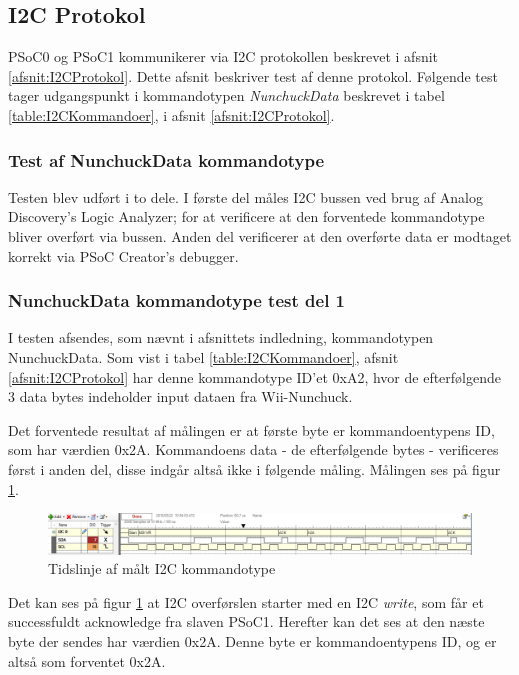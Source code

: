 \subsection{I2C Protokol}
PSoC0 og PSoC1 kommunikerer via I2C protokollen beskrevet i afsnit \ref{afsnit:I2CProtokol}. Dette afsnit beskriver test af denne protokol. Følgende test tager udgangspunkt i kommandotypen \textit{NunchuckData} beskrevet i tabel \ref{table:I2CKommandoer}, i afsnit \ref{afsnit:I2CProtokol}.

\subsubsection{Test af NunchuckData kommandotype} 

Testen blev udført i to dele. I første del måles I2C bussen ved brug af Analog Discovery's Logic Analyzer; for at verificere at den forventede kommandotype bliver overført via bussen. Anden del verificerer at den overførte data er modtaget korrekt via PSoC Creator's debugger.

\subsubsection{NunchuckData kommandotype test del 1}

I testen afsendes, som nævnt i afsnittets indledning, kommandotypen NunchuckData. Som vist i tabel \ref{table:I2CKommandoer}, afsnit \ref{afsnit:I2CProtokol} har denne kommandotype ID'et 0xA2, hvor de efterfølgende 3 data bytes indeholder input dataen fra Wii-Nunchuck. \newline

\noindent Det forventede resultat af målingen er at første byte er kommandoentypens ID, som har værdien 0x2A. Kommandoens data - de efterfølgende bytes - verificeres først i anden del, disse indgår altså ikke i følgende måling. Målingen ses på figur \ref{fig:NunchuckDataCommand}.

\begin{figure}[H]
	\centering
	\includegraphics[width=1.2\textwidth]{Test/images/ShowsNunchuckDataCommand.png}
	\caption{Tidslinje af målt I2C kommandotype}
	\label{fig:NunchuckDataCommand}
\end{figure}

\noindent Det kan ses på figur \ref{fig:NunchuckDataCommand} at I2C overførslen starter med en I2C \textit{write}, som får et successfuldt acknowledge fra slaven PSoC1. Herefter kan det ses at den næste byte der sendes har værdien 0x2A. Denne byte er kommandoentypens ID, og er altså som forventet 0x2A. \newline

